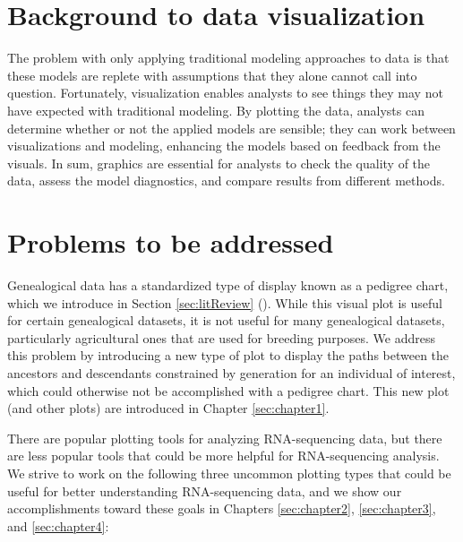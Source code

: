 \documentclass[11pt,a4paper,oldfontcommands,openany]{memoir}
\numberwithin{equation}{section} %
\begin{document}
\section{Background to data visualization}

The problem with only applying traditional modeling approaches to data is that these models are replete with assumptions that they alone cannot call into question. Fortunately, visualization enables analysts to see things they may not have expected with traditional modeling. By plotting the data, analysts can determine whether or not the applied models are sensible; they can work between visualizations and modeling, enhancing the models based on feedback from the visuals. In sum, graphics are essential for analysts to check the quality of the data, assess the model diagnostics, and compare results from different methods.

\section{Problems to be addressed}

Genealogical data has a standardized type of display known as a pedigree chart, which we introduce in Section \ref{sec:litReview} (\citealt{ped}). While this visual plot is useful for certain genealogical datasets, it is not useful for many genealogical datasets, particularly agricultural ones that are used for breeding purposes. We address this problem by introducing a new type of plot to display the paths between the ancestors and descendants constrained by generation for an individual of interest, which could otherwise not be accomplished with a pedigree chart. This new plot (and other plots) are introduced in Chapter \ref{sec:chapter1}.

There are popular plotting tools for analyzing RNA-sequencing data, but there are less popular tools that could be more helpful for RNA-sequencing analysis. We strive to work on the following three uncommon plotting types that could be useful for better understanding RNA-sequencing data, and we show our accomplishments toward these goals in Chapters \ref{sec:chapter2}, \ref{sec:chapter3}, and \ref{sec:chapter4}:

\clearpage
\end{document}
